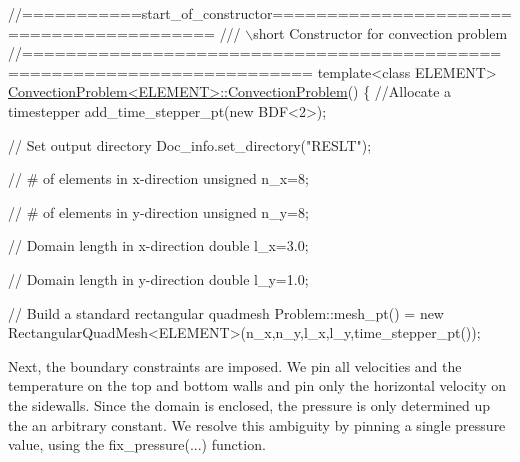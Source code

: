  
\begin{DoxyCodeInclude}
\textcolor{comment}{//===========start\_of\_constructor=========================================}
\textcolor{comment}{/// \(\backslash\)short Constructor for convection problem}
\textcolor{comment}{}\textcolor{comment}{//========================================================================}
\textcolor{keyword}{template}<\textcolor{keyword}{class} ELEMENT>
\hyperlink{classConvectionProblem_a0c68c4c4b67d9fc8c9900fc895eed973}{ConvectionProblem<ELEMENT>::ConvectionProblem}()
\{
 \textcolor{comment}{//Allocate a timestepper}
 add\_time\_stepper\_pt(\textcolor{keyword}{new} BDF<2>);

 \textcolor{comment}{// Set output directory}
 Doc\_info.set\_directory(\textcolor{stringliteral}{"RESLT"});
 
 \textcolor{comment}{// # of elements in x-direction}
 \textcolor{keywordtype}{unsigned} n\_x=8;

 \textcolor{comment}{// # of elements in y-direction}
 \textcolor{keywordtype}{unsigned} n\_y=8;

 \textcolor{comment}{// Domain length in x-direction}
 \textcolor{keywordtype}{double} l\_x=3.0;

 \textcolor{comment}{// Domain length in y-direction}
 \textcolor{keywordtype}{double} l\_y=1.0;

 \textcolor{comment}{// Build a standard rectangular quadmesh}
 Problem::mesh\_pt() = 
  \textcolor{keyword}{new} RectangularQuadMesh<ELEMENT>(n\_x,n\_y,l\_x,l\_y,time\_stepper\_pt());

\end{DoxyCodeInclude}


Next, the boundary constraints are imposed. We pin all velocities and the temperature on the top and bottom walls and pin only the horizontal velocity on the sidewalls. Since the domain is enclosed, the pressure is only determined up the an arbitrary constant. We resolve this ambiguity by pinning a single pressure value, using the {\ttfamily fix\+\_\+pressure}(...) function.


